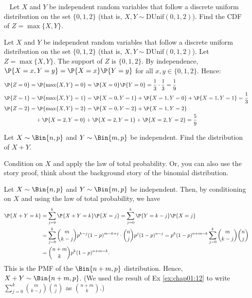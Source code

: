 \begin{exercise}~
	Let $X$ and $Y$ be independent random variables that follow a discrete uniform distribution on the set $\{0, 1, 2\}$ (that is, $X,Y \sim \text{DUnif}(0,1,2)$). Find the CDF of $Z = \max\{X, Y\}$.
 	\begin{solution}
 		Let $X$ and $Y$ be independent random variables that follow a discrete uniform distribution on the set $\{0, 1, 2\}$ (that is, $X,Y \sim \text{DUnif}(0,1,2)$). Let $Z = \max\{X, Y\}$. The support of $Z$ is $\{0, 1, 2\}$. By independence, $\P{X = x, Y = y} = \P{X = x} \P{Y = y}$ for all $x, y \in \{0,1,2\}$. Hence:
		\begin{align*}
 			\P{Z = 0} & = \P{\max\{X, Y\} = 0} = \P{X = 0} \P{Y = 0} = \frac{1}{3} \cdot \frac{1}{3} = \frac{1}{9} \\
 			\P{Z = 1} & = \P{\max\{X, Y\} = 1} = \P{X = 0, Y = 1} + \P{X = 1, Y = 0} + \P{X = 1, Y = 1} = \frac{1}{3} \\
 			\P{Z = 2} & = \P{\max\{X, Y\} = 2} = \P{X = 0, Y = 2} + \P{X = 1, Y = 2} \\
 			& \quad + \P{X = 2, Y = 0} + \P{X = 2, Y = 1} + \P{X = 2, Y = 2} = \frac{5}{9}
 		\end{align*}
 	\end{solution}
\end{exercise}

\begin{exercise}\label{ex:chap03:10}
 	Let $X \sim \Bin{n, p}$ and $Y \sim \Bin{m, p}$ be independent. Find the distribution of $X + Y$.
 	\begin{hint}
 		Condition on $X$ and apply the law of total probability. Or, you can also use the story proof, think about the background story of the binomial distribution.
 	\end{hint}
	\begin{solution}
		Let $X \sim \Bin{n, p}$ and $Y \sim \Bin{m, p}$ be independent. Then, by conditioning on $X$ and using the law of total probability, we have
		\begin{align*}
			\P{X + Y = k} & = \sum_{j = 0}^k \P{X + Y = k} \P{X = j} = \sum_{j = 0}^k \P{Y = k - j} \P{X = j} \\
			& = \sum_{j = 0}^k \binom{m}{k - j} p^{k - j} (1 - p)^{m - k + j} \cdot \binom{n}{j} p^j (1 - p)^{n - j} = p^k (1 - p)^{n + m - k} \sum_{j = 0}^k \binom{m}{k - j} \binom{n}{j} \\
			& = \binom{n + m}{k} p^k (1 - p)^{n + m - k}.
		\end{align*}
		This is the PMF of the $\Bin{n + m, p}$ distribution. Hence, $X + Y \sim \Bin{n + m, p}$. 	(We used the result of Ex \ref{ex:chap01:12} to write $\sum_{j = 0}^k \binom{m}{k - j} \binom{n}{j}$ as $\binom{n + m}{k}$.)
	\end{solution}
\end{exercise}

